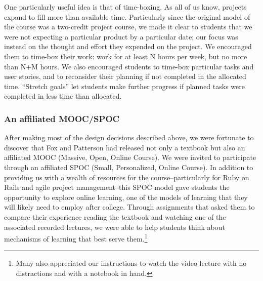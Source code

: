 One particularly useful idea is that of time-boxing.
As all of us know, projects expand to fill more than available time.
Particularly since the original model of the course was a two-credit
project course, we made it clear to students that we were not expecting
a particular product by a particular date; our focus was instead on the
thought and effort they expended on the project.  We encouraged them
to time-box their work: work for at least N hours per week, but no more
than N+M hours.  We also encouraged students to time-box particular tasks 
and user stories, and to reconsider their planning if not completed in the 
allocated time.  ``Stretch goals'' let students make further progress 
if planned tasks were completed in less time than allocated.  

\subsubsection{An affiliated MOOC/SPOC}

After making most of the design decisions described above, we were
fortunate to discover that Fox and Patterson had released not only
a textbook \cite{saasbook} but also an affiliated MOOC (Massive,
Open, Online Course).  We were invited to participate through
an affiliated SPOC (Small, Personalized, Online Course).
In addition to providing us with a wealth of resources for the
course--particularly for Ruby on Rails and agile project management--this
SPOC model gave students the opportunity to explore
online learning, one of the models of learning that they will likely
need to employ after college.  Through assignments that asked them
to compare their experience reading the textbook and watching one
of the associated recorded lectures, we were able to help students
think about mechanisms of learning that best serve them.\footnote{Many also
appreciated our instructions to watch the video lecture with no distractions
and with a notebook in hand.}


%
%
%
%
